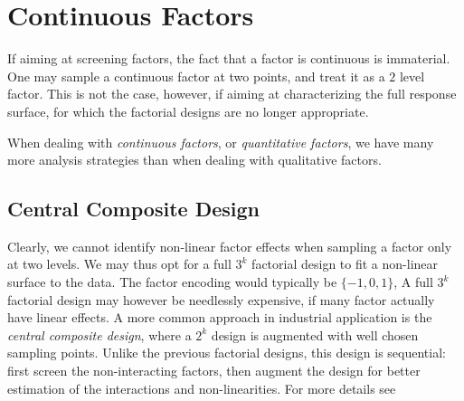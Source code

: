 %
%
%







\section{Continuous Factors}

If aiming at screening factors, the fact that a factor is continuous is immaterial. 
One may sample a continuous factor at two points, and treat it as a $2$ level factor.
This is not the case, however, if aiming at characterizing the full response surface, for which the factorial designs are no longer appropriate. 

When dealing with \emph{continuous factors}, or \emph{quantitative factors}, we have many more analysis strategies than when dealing with qualitative factors.


\subsection{Central Composite Design}
\label{sec:central_composite}

Clearly, we cannot identify non-linear factor effects when sampling a factor only at two levels.
We may thus opt for a full $3^k$ factorial design to fit a non-linear surface to the data.
The factor encoding would typically be $\{-1,0,1\}$,
A full $3^k$ factorial design may however be needlessly expensive, if many factor actually have linear effects.
A more common approach in industrial application is the \emph{central composite design}, where a $2^k$ design is augmented with well chosen sampling points. 
Unlike the previous factorial designs, this design is sequential: 
first screen the non-interacting factors, then augment the design for better estimation of the interactions and non-linearities. 
For more details see \cite[Sec.6.6]{cox_theory_2000}



